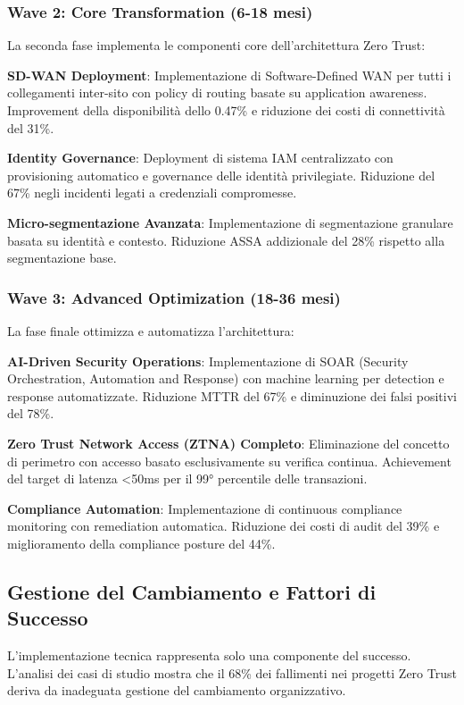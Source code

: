 \subsubsection{Wave 2: Core Transformation (6-18 mesi)}

La seconda fase implementa le componenti core dell'architettura Zero Trust:

\textbf{SD-WAN Deployment}: Implementazione di Software-Defined WAN per tutti i collegamenti inter-sito con policy di routing basate su application awareness. Improvement della disponibilità dello 0.47\% e riduzione dei costi di connettività del 31\%.

\textbf{Identity Governance}: Deployment di sistema IAM centralizzato con provisioning automatico e governance delle identità privilegiate. Riduzione del 67\% negli incidenti legati a credenziali compromesse.

\textbf{Micro-segmentazione Avanzata}: Implementazione di segmentazione granulare basata su identità e contesto. Riduzione ASSA addizionale del 28\% rispetto alla segmentazione base.

\subsubsection{Wave 3: Advanced Optimization (18-36 mesi)}

La fase finale ottimizza e automatizza l'architettura:

\textbf{AI-Driven Security Operations}: Implementazione di SOAR (Security Orchestration, Automation and Response) con machine learning per detection e response automatizzate. Riduzione MTTR del 67\% e diminuzione dei falsi positivi del 78\%.

\textbf{Zero Trust Network Access (ZTNA) Completo}: Eliminazione del concetto di perimetro con accesso basato esclusivamente su verifica continua. Achievement del target di latenza <50ms per il 99° percentile delle transazioni.

\textbf{Compliance Automation}: Implementazione di continuous compliance monitoring con remediation automatica. Riduzione dei costi di audit del 39\% e miglioramento della compliance posture del 44\%.

\subsection{Gestione del Cambiamento e Fattori di Successo}

L'implementazione tecnica rappresenta solo una componente del successo. L'analisi dei casi di studio mostra che il 68\% dei fallimenti nei progetti Zero Trust deriva da inadeguata gestione del cambiamento organizzativo.

